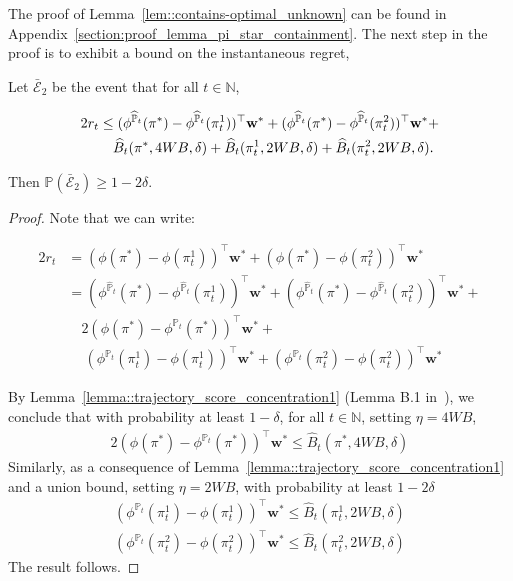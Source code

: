 The proof of Lemma~\ref{lem::contains-optimal_unknown} can be found in Appendix~\ref{section:proof_lemma_pi_star_containment}. The next step in the proof is to exhibit a bound on the instantaneous regret,

\begin{lemma}\label{lemma::first_unknown_model_lemma}
Let $\bar{\mathcal{E}}_2$ be the event that for all $t \in \mathbb{N}$,

\begin{small}
\begin{align*}
 2r_t  &\leq  (\phi^{\widehat{\mathbb{P}}_t}(\pi^*) - \phi^{\widehat{\mathbb{P}}_t}(\pi_t^1))^\top {\mathbf w}^* + (\phi^{\widehat{\mathbb{P}}_t}(\pi^*) - \phi^{\widehat{\mathbb{P}}_t}(\pi_t^2))^\top {\mathbf w}^* + \notag \\
 &\quad \widehat{B}_t(\pi^*, 4WB, \delta) +  \widehat{B}_t(\pi_t^1, 2WB, \delta)  +  \widehat{B}_t(\pi_t^2, 2WB, \delta). 
\end{align*}
\end{small}
 Then $\mathbb{P}\left( \bar{\mathcal{E}}_2 \right) \geq 1-2\delta$.
\end{lemma}

\begin{proof} Note that we can write:
\begin{small}
\begin{align*}
 2r_t & = (\phi(\pi^*) - \phi(\pi_t^1))^\top {\mathbf w}^* + (\phi(\pi^*) - \phi(\pi_t^2))^\top {\mathbf w}^*\\
   &=  (\phi^{\widehat{\mathbb{P}}_t}(\pi^*) - \phi^{\widehat{\mathbb{P}}_t}(\pi_t^1))^\top {\mathbf w}^* + (\phi^{\widehat{\mathbb{P}}_t}(\pi^*) - \phi^{\widehat{\mathbb{P}}_t}(\pi_t^2))^\top {\mathbf w}^* +\\
   &\quad  2( \phi(\pi^*) - \phi^{\mathbb{P}_t}(\pi^*))^\top {\mathbf w}^* +\\
   &~\quad (\phi^{\mathbb{P}_t}(\pi_t^1) -  \phi(\pi_t^1))^\top {\mathbf w}^* + (\phi^{\mathbb{P}_t}(\pi_t^2) -  \phi(\pi_t^2))^\top {\mathbf w}^*
\end{align*}
\end{small}
By Lemma~\ref{lemma::trajectory_score_concentration1} (Lemma B.1 in~\cite{chatterji21}), we conclude that with probability at least $1-\delta$, for all $t \in \mathbb{N}$, setting $\eta = 4 W B$, 
\begin{align*}
    2( \phi(\pi^*) - \phi^{\mathbb{P}_t}(\pi^*))^\top {\mathbf w}^* \leq  \widehat{B}_t(\pi^*, 4WB, \delta)  
\end{align*}
Similarly, as a consequence of Lemma~\ref{lemma::trajectory_score_concentration1} and a union bound, setting $\eta = 2WB$, with probability at least $1-2\delta$ 
\begin{align*}
    (\phi^{\mathbb{P}_t}(\pi_t^1) -  \phi(\pi_t^1))^\top {\mathbf w}^*  \leq \widehat{B}_t(\pi_t^1, 2WB, \delta)  \\
    (\phi^{\mathbb{P}_t}(\pi_t^2) -  \phi(\pi_t^2))^\top {\mathbf w}^*  \leq \widehat{B}_t(\pi_t^2, 2WB, \delta)
\end{align*}
The result follows. 
\end{proof}

